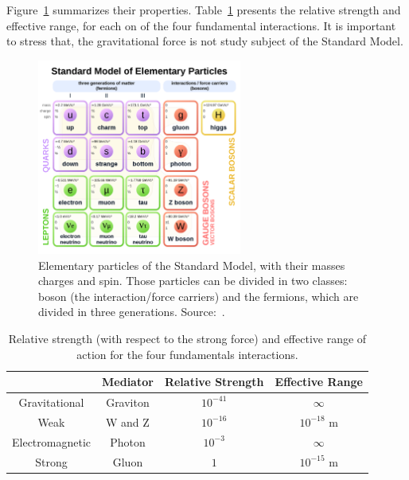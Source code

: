Figure~\ref{sm_summary} summarizes their properties. Table~\ref{fundamental_forces} presents the relative strength and effective range, for each on of the four fundamental interactions. It is important to stress that, the gravitational force is not study subject of the Standard Model.

\begin{figure}[!htbp]
  \begin{center}
  \includegraphics[width=0.6\textwidth ]{figures_and_tables/theory/sm.png}
  \end{center}\vspace*{-.5cm}
  \caption{Elementary particles of the Standard Model, with their masses charges and spin. Those particles can be divided in two classes: boson (the interaction/force carriers) and the fermions, which are divided in three generations. Source:~\cite{fig_sm_summary}.}
  \label{sm_summary}
  \end{figure}
 

\begin{table}[htp]
  \begin{center}
      \caption{Relative strength (with respect to the strong force) and effective range of action for the four fundamentals interactions.}
    \begin{tabular}{ cccc }
       & Mediator & Relative Strength & Effective Range \\ \hline
      Gravitational & Graviton & $10^{-41}$ & $\infty$ \\ 
      Weak & W and Z & $10^{-16}$ & $10^{-18}$ m \\ 
      Electromagnetic & Photon & $10^{-3}$ & $\infty$ \\ 
      Strong & Gluon & $1$ & $10^{-15}$ m\\ \hline
      \end{tabular}
  \label{fundamental_forces}
  \end{center} 
  \end{table}


